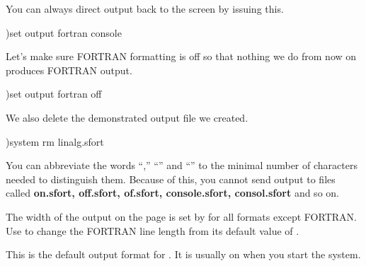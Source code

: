 \begin{nullXtc}
\begin{xtccomment}
You can always direct output back to the screen by issuing this.
\end{xtccomment}
\begin{spadsrc}
)set output fortran console
\end{spadsrc}
\end{nullXtc}
\begin{nullXtc}
\begin{xtccomment}
Let's make sure FORTRAN formatting is off so that nothing we
do from now on produces FORTRAN output.
\end{xtccomment}
\begin{spadsrc}
)set output fortran off
\end{spadsrc}
\end{nullXtc}
\begin{nullXtc}
\begin{xtccomment}
We also delete the demonstrated output file we created.
\end{xtccomment}
\begin{spadsrc}
)system rm linalg.sfort
\end{spadsrc}
\end{nullXtc}

You can abbreviate the words ``,'' ``'' and
``'' to the minimal number
of characters needed to distinguish them.
Because of this, you cannot send output to files called
{\bf on.sfort, off.sfort, of.sfort,
console.sfort, consol.sfort} and so on.

The width of the output on the page is set by
for all formats except FORTRAN.
Use  to
change the FORTRAN line length from its default value of .


This is the default output format for \Language{}.
It is usually on when you start the system.

